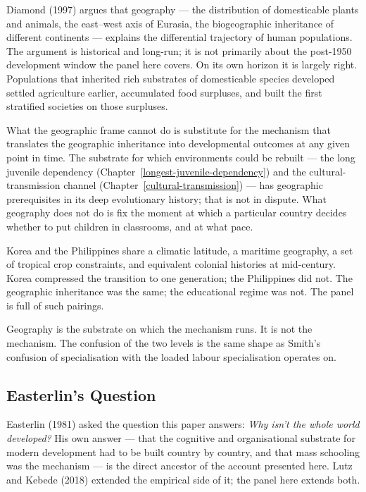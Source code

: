 \documentclass[12pt,letterpaper]{article}
\begin{document}
{Diamond (1997) argues that geography --- the distribution of domesticable plants and animals, the east--west axis of Eurasia, the biogeographic inheritance of different continents --- explains the differential trajectory of human populations. The argument is historical and long-run; it is not primarily about the post-1950 development window the panel here covers. On its own horizon it is largely right. Populations that inherited rich substrates of domesticable species developed settled agriculture earlier, accumulated food surpluses, and built the first stratified societies on those surpluses.

What the geographic frame cannot do is substitute for the mechanism that translates the geographic inheritance into developmental outcomes at any given point in time. The substrate for which environments could be rebuilt --- the long juvenile dependency (Chapter~\ref{longest-juvenile-dependency}) and the cultural-transmission channel (Chapter~\ref{cultural-transmission}) --- has geographic prerequisites in its deep evolutionary history; that is not in dispute. What geography does not do is fix the moment at which a particular country decides whether to put children in classrooms, and at what pace.

Korea and the Philippines share a climatic latitude, a maritime geography, a set of tropical crop constraints, and equivalent colonial histories at mid-century. Korea compressed the transition to one generation; the Philippines did not. The geographic inheritance was the same; the educational regime was not. The panel is full of such pairings.

Geography is the substrate on which the mechanism runs. It is not the mechanism. The confusion of the two levels is the same shape as Smith's confusion of specialisation with the loaded labour specialisation operates on.

\subsection{Easterlin's Question}\label{easterlins-question}

Easterlin (1981) asked the question this paper answers: \emph{Why isn't the whole world developed?} His own answer --- that the cognitive and organisational substrate for modern development had to be built country by country, and that mass schooling was the mechanism --- is the direct ancestor of the account presented here. Lutz and Kebede (2018) extended the empirical side of it; the panel here extends both.

}
\end{document}
